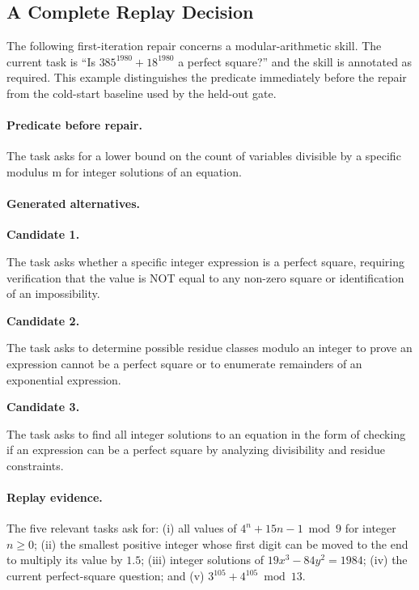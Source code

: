 \subsection{A Complete Replay Decision}
\label{app:prompt-trace}
The following first-iteration repair concerns a modular-arithmetic skill. The current task is ``Is $385^{1980}+18^{1980}$ a perfect square?'' and the skill is annotated as required. This example distinguishes the predicate immediately before the repair from the cold-start baseline used by the held-out gate.

\paragraph{Predicate before repair.}
\begingroup
\small\ttfamily\raggedright
The task asks for a lower bound on the count of variables divisible by a specific modulus m for integer solutions of an equation.
\par
\endgroup

\paragraph{Generated alternatives.}
\noindent\textbf{Candidate 1.}
\begingroup
\small\ttfamily\raggedright
The task asks whether a specific integer expression is a perfect square, requiring verification that the value is NOT equal to any non-zero square or identification of an impossibility.
\par
\endgroup
\noindent\textbf{Candidate 2.}
\begingroup
\small\ttfamily\raggedright
The task asks to determine possible residue classes modulo an integer to prove an expression cannot be a perfect square or to enumerate remainders of an exponential expression.
\par
\endgroup
\noindent\textbf{Candidate 3.}
\begingroup
\small\ttfamily\raggedright
The task asks to find all integer solutions to an equation in the form of checking if an expression can be a perfect square by analyzing divisibility and residue constraints.
\par
\endgroup

\paragraph{Replay evidence.}
The five relevant tasks ask for: (i) all values of $4^n+15n-1\bmod9$ for integer $n\geq0$; (ii) the smallest positive integer whose first digit can be moved to the end to multiply its value by $1.5$; (iii) integer solutions of $19x^3-84y^2=1984$; (iv) the current perfect-square question; and (v) $3^{105}+4^{105}\bmod13$.

